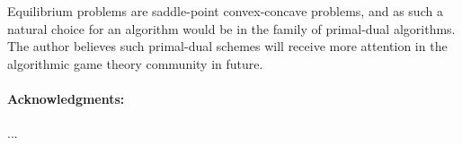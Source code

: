\documentclass[envcountsame]{llncs} %
\begin{document}
Equilibrium problems are saddle-point convex-concave problems, and as
such a natural choice for an algorithm would be in the family of
primal-dual algorithms. The author believes such primal-dual schemes
will receive more attention in the algorithmic game theory community
in future.


\medskip \noindent

\paragraph{Acknowledgments:} ...
\small


\end{document}
